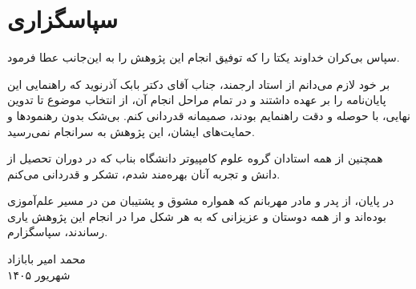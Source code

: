 \chapter*{سپاسگزاری}

سپاس بی‌کران خداوند یکتا را که توفیق انجام این پژوهش را به این‌جانب عطا فرمود.

بر خود لازم می‌دانم از استاد ارجمند، جناب آقای دکتر بابک آذرنوید که راهنمایی این
پایان‌نامه را بر عهده داشتند و در تمام مراحل انجام آن، از انتخاب موضوع تا تدوین
نهایی، با حوصله و دقت راهنمایم بودند، صمیمانه قدردانی کنم. بی‌شک بدون رهنمودها
و حمایت‌های ایشان، این پژوهش به سرانجام نمی‌رسید.

همچنین از همه استادان گروه علوم کامپیوتر دانشگاه بناب که در دوران تحصیل از
دانش و تجربه آنان بهره‌مند شدم، تشکر و قدردانی می‌کنم.

در پایان، از پدر و مادر مهربانم که همواره مشوق و پشتیبان من در مسیر علم‌آموزی
بوده‌اند و از همه دوستان و عزیزانی که به هر شکل مرا در انجام این پژوهش یاری
رساندند، سپاسگزارم.

\begin{flushleft}
محمد امیر بابازاد\\
شهریور ۱۴۰۵
\end{flushleft}
